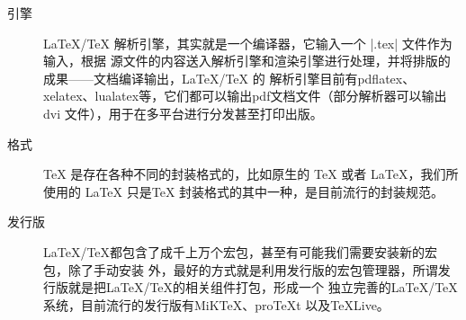 \begin{description}
  \item[引擎] \LaTeX{}/\TeX{} 解析引擎，其实就是一个编译器，它输入一个 |.tex| 文件作为输入，根据
    源文件的内容送入解析引擎和渲染引擎进行处理，并将排版的成果——文档编译输出，\LaTeX{}/\TeX{} 的
    解析引擎目前有pdflatex、xelatex、lualatex等，它们都可以输出pdf文档文件（部分解析器可以输出dvi
    文件），用于在多平台进行分发甚至打印出版。
  \item[格式] \TeX{} 是存在各种不同的封装格式的，比如原生的 \TeX{} 或者 \LaTeX{}，我们所使用的
    \LaTeX{} 只是\TeX{} 封装格式的其中一种，是目前流行的封装规范。
  \item[发行版] \LaTeX/\TeX{}都包含了成千上万个宏包，甚至有可能我们需要安装新的宏包，除了手动安装
    外，最好的方式就是利用发行版的宏包管理器，所谓发行版就是把\LaTeX/\TeX{}的相关组件打包，形成一个
    独立完善的\LaTeX/\TeX{}系统，目前流行的发行版有MiKTeX、proTeXt 以及TeXLive。
\end{description}


%
%
%
%
%
%



